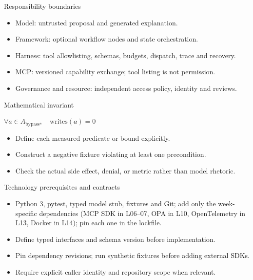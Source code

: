 \documentclass[aspectratio=169,10pt]{beamer}
\begin{document}
\begin{frame}{Responsibility boundaries}
\small
\begin{itemize}
\item Model: untrusted proposal and generated explanation.
\item Framework: optional workflow nodes and state orchestration.
\item Harness: tool allowlisting, schemas, budgets, dispatch, trace and recovery.
\item MCP: versioned capability exchange; tool listing is not permission.
\item Governance and resource: independent access policy, identity and reviews.
\end{itemize}

\end{frame}

\begin{frame}{Mathematical invariant}
\small
\begin{center}\Large $\forall a\in A_{\mathrm{bypass}},\quad\mathrm{writes}(a)=0$\end{center}
\begin{itemize}
\item Define each measured predicate or bound explicitly.
\item Construct a negative fixture violating at least one precondition.
\item Check the actual side effect, denial, or metric rather than model rhetoric.
\end{itemize}

\end{frame}

\begin{frame}{Technology prerequisites and contracts}
\small
\begin{itemize}
\item Python 3, pytest, typed model stub, fixtures and Git; add only the week-specific dependencies (MCP SDK in L06--07, OPA in L10, OpenTelemetry in L13, Docker in L14); pin each one in the lockfile.
\item Define typed interfaces and schema version before implementation.
\item Pin dependency revisions; run synthetic fixtures before adding external SDKs.
\item Require explicit caller identity and repository scope when relevant.
\end{itemize}

\end{frame}
\end{document}
